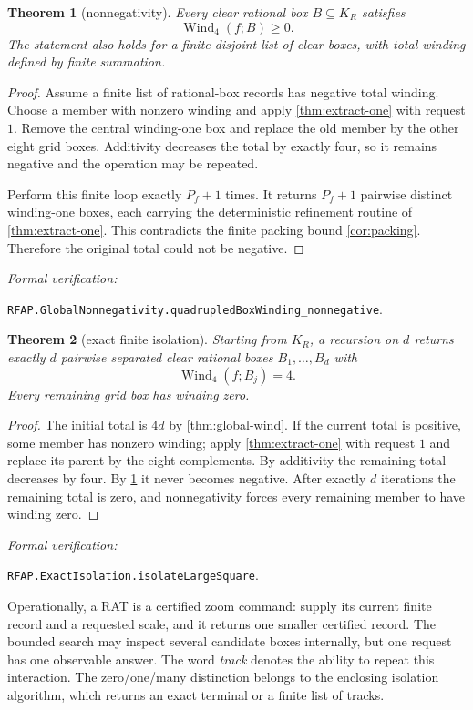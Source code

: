 \documentclass[11pt]{article}
\newtheorem{theorem}{Theorem}[section]
\newcommand{\Wind}{\operatorname{Wind}}
\newcommand{\leanref}[1]{\par\smallskip\noindent
  \emph{Formal verification:}\par\nobreak
  {\raggedright\nolinkurl{#1}.\par}}
\begin{document}
\begin{theorem}[nonnegativity]
\label{thm:nonnegative}
Every clear rational box $B\subseteq K_R$ satisfies
\[
             \Wind_4(f;B)\ge0.
\]
The statement also holds for a finite disjoint list of clear boxes, with
total winding defined by finite summation.
\end{theorem}

\begin{proof}
Assume a finite list of rational-box records has negative total winding.
Choose a member
with nonzero winding and apply \cref{thm:extract-one} with request $1$.
Remove the central winding-one box and replace the old member by the
other eight grid boxes.  Additivity decreases the total by exactly four,
so it remains negative and the operation may be repeated.

Perform this finite loop exactly $P_f+1$ times.  It returns $P_f+1$ pairwise distinct winding-one boxes, each carrying the deterministic refinement routine of \cref{thm:extract-one}.  This contradicts the finite packing bound \cref{cor:packing}.  Therefore the original total could not be negative.
\end{proof}

\leanref{RFAP.GlobalNonnegativity.quadrupledBoxWinding_nonnegative}

\begin{theorem}[exact finite isolation]
\label{thm:isolation}
Starting from $K_R$, a recursion on $d$ returns exactly $d$ pairwise separated clear rational boxes $B_1,\dots,B_d$ with
\[
       \Wind_4(f;B_j)=4.
\]
Every remaining grid box has winding zero.
\end{theorem}

\begin{proof}
The initial total is $4d$ by \cref{thm:global-wind}.  If the current
total is positive, some member has nonzero winding; apply
\cref{thm:extract-one} with request $1$ and replace its parent by the eight
complements.  By additivity the remaining total decreases by four.  By
\cref{thm:nonnegative} it never becomes negative.  After exactly $d$
iterations the remaining total is zero, and nonnegativity forces every
remaining member to have winding zero.
\end{proof}

\leanref{RFAP.ExactIsolation.isolateLargeSquare}

Operationally, a RAT is a certified zoom command: supply its current finite
record and a requested scale, and it returns one smaller certified record.
The bounded search may inspect several candidate boxes internally, but one
request has one observable answer.  The word \emph{track} denotes the ability
to repeat this interaction.  The zero/one/many distinction belongs to the
enclosing isolation algorithm, which returns an exact terminal or a finite
list of tracks.
\end{document}

